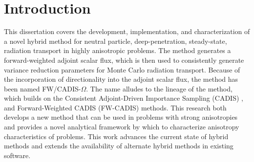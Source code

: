 \chapter{Introduction}
\label{ch:introduction}

This dissertation covers the development,
implementation, and characterization
of a novel hybrid method for neutral particle, deep-penetration, steady-state,
radiation transport in
highly anisotropic problems. The method generates a forward-weighted adjoint
scalar flux, which is then used to consistently generate variance reduction
parameters for Monte Carlo radiation transport. Because of the incorporation
of directionality into the adjoint scalar flux,
the method has been named FW/CADIS-$\Omega$. The name alludes to the lineage of
the method, which builds on
the Consistent Adjoint-Driven Importance Sampling (CADIS)
\cite{wagner_automatic_1997, wagner_automated_1998, wagner_automated_2002,
haghighat_monte_2003},
and Forward-Weighted CADIS (FW-CADIS)
\cite{wagner_forward-weighted_2007,
wagner_forward-weighted_2009} methods.
This research both develops a new method that can be used in problems with
strong anisotropies and provides a novel
analytical framework by which to characterize anisotropy characteristics of
problems. This
work advances the current state of hybrid methods and extends the availability
of alternate hybrid methods in existing software.




% 



